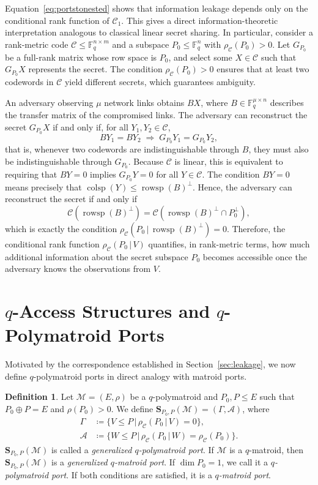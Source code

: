 \documentclass[onecolumn,draftclsnofoot,12pt]{IEEEtran}
\newcommand{\F}{\mathbb{F}}
\newcommand{\C}{\mathcal{C}}
\newcommand{\colsp}{\operatorname{colsp}}
\DeclareMathOperator{\rowsp}{rowsp}
\theoremstyle{plain} %
\theoremstyle{definition}
\newtheorem{definition}[theorem]{Definition}
\begin{document}
Equation~\eqref{eq:portstonested} shows that information leakage depends only on the conditional rank function of $\C_1$. This gives a direct information-theoretic interpretation analogous to classical linear secret sharing. In particular, consider a rank-metric code $\C \leq \F_q^{n\times m}$ and a subspace $P_0 \leq \F_q^n$ with $\rho_\C(P_0)>0$. Let $G_{P_0}$ be a full-rank matrix whose row space is $P_0$, and select some $X \in \C$ such that $G_{P_0}X$ represents the secret. The condition $\rho_\C(P_0)>0$ ensures that at least two codewords in $\C$ yield different secrets, which guarantees ambiguity. 

An adversary observing $\mu$ network links obtains $BX$, where $B \in \F_q^{\mu\times n}$ describes the transfer matrix of the compromised links. The adversary can reconstruct the secret $G_{P_0}X$ if and only if, for all $Y_1,Y_2 \in \C$, 
\[
BY_1 = BY_2 \;\Rightarrow\; G_{P_0}Y_1 = G_{P_0}Y_2,
\]
that is, whenever two codewords are indistinguishable through $B$, they must also be indistinguishable through $G_{P_0}$. Because $\C$ is linear, this is equivalent to requiring that $BY = 0$ implies $G_{P_0}Y = 0$ for all $Y \in \C$. The condition $BY=0$ means precisely that $\colsp(Y) \leq \rowsp(B)^\perp$. Hence, the adversary can reconstruct the secret if and only if
\[
\C(\rowsp(B)^\perp) = \C(\rowsp(B)^\perp \cap P_0^\perp),
\]
which is exactly the condition $\rho_\C(P_0 \,|\, \rowsp(B)^\perp) = 0$. Therefore, the conditional rank function $\rho_\C(P_0 \,|\, V)$ quantifies, in rank-metric terms, how much additional information about the secret subspace $P_0$ becomes accessible once the adversary knows the observations from $V$.




\section{\texorpdfstring{$q$}{q}-Access Structures and \texorpdfstring{$q$}{q}-Polymatroid Ports} \label{sec:ports}


Motivated by the correspondence established in Section~\ref{sec:leakage}, we now define $q$-polymatroid ports in direct analogy with matroid ports.

\begin{definition}
Let $\mathcal{M}=(E,\rho)$ be a $q$-polymatroid and $P_0,P \leq E$ such that $P_0 \oplus P = E$ and $\rho(P_0) > 0$. We define $\mathbf{S}_{P_0,P}(\mathcal{M}) = (\Gamma, \mathcal{A})$, where
\begin{align*}
    \Gamma &\coloneq \{V\leq P \, |\, \rho_{\mathcal{C}}(P_0 \,|\, V ) = 0\}, \\
    \mathcal{A} &\coloneqq \{W\leq P \,|\, \rho_{\mathcal{C}}(P_0\,|\, W ) = \rho_{\mathcal{C}}(P_0)\}.
\end{align*}
$\mathbf{S}_{P_0,P}(\mathcal{M})$ is called a \textit{generalized $q$-polymatroid port}. If $ \mathcal{M}$ is a $q$-matroid, then $\mathbf{S}_{P_0,P}(\mathcal{M})$ is a \textit{generalized $q$-matroid port}. If $\dim P_0 = 1$, we call it a \textit{$q$-polymatroid port}. If both conditions are satisfied, it is a \textit{$q$-matroid port}. 
\end{definition}
\end{document}
